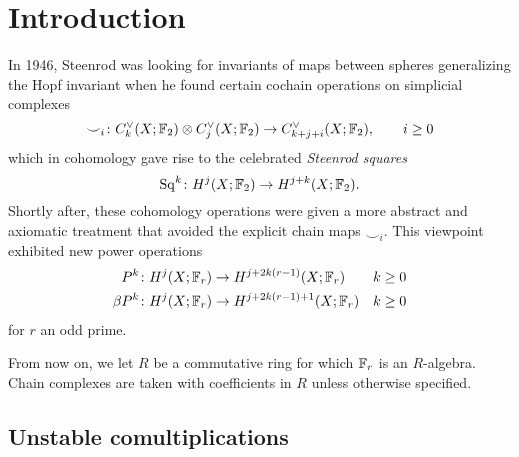 
\section{Introduction}\label{s:introduction}

In 1946, Steenrod was looking for invariants of maps between spheres generalizing the Hopf invariant when he found certain cochain operations on simplicial complexes
\[
\smile_i \colon  \ucocadenas[k](X;\bF_2) \ot  \ucocadenas[j](X;\bF_2)\to \ucocadenas[k+j+i](X;\bF_2),\qquad i\geq 0
\]
which in cohomology gave rise to the celebrated \emph{Steenrod squares}
\[
\Sq^{k} \colon  H^j(X;\bF_2)\to H^{j+k}(X;\bF_2).
\]
Shortly after, these cohomology operations were given a more abstract and axiomatic treatment that avoided the explicit chain maps $\smile_i$.
This viewpoint exhibited new power operations
\begin{align*}
	P^{k} \colon  H^j(X;\bF_r)&\to H^{j+2k(r-1)}(X;\bF_r) & k\geq 0 \\
	\beta P^k \colon  H^j(X;\bF_r)&\to H^{j+2k(r-1)+1}(X;\bF_r) & k\geq 0
\end{align*}
for $r$ an odd prime.

From now on, we let $R$ be a commutative ring for which $\bF_r$ is an $R$-algebra.
Chain complexes are taken with coefficients in $R$ unless otherwise specified.

\subsection{Unstable comultiplications}

